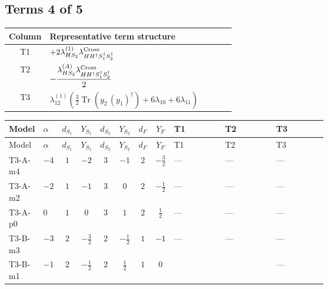 \documentclass[8pt]{article}
\begin{document}
\begin{landscape}
\subsection*{Terms 4 of 5}
\begin{center}
\begin{tabular}{@{}c >{\raggedright\arraybackslash}p{0.82\linewidth}@{}}
\toprule
Column & Representative term structure \\
\midrule
T1 & \(\displaystyle +2 {\lambda_{HS_2}^{(1)}} {\lambda_{H H^\dagger S_1^\dagger S_2^\dagger}^{\rm Cross}}\) \\
\midrule
T2 & \(\displaystyle -\frac{{\lambda_{HS_2}^{(A)}} {\lambda_{H H^\dagger S_1^\dagger S_2^\dagger}^{\rm Cross}}}{2}\) \\
\midrule
T3 & \(\displaystyle {\lambda_{12}^{(1)}} \left(\frac{3}{2} \operatorname{Tr}\!\left({y_2}\,\left({y_1}\right)^{\dagger}\right)+6 {\lambda_{10}}+6 {\lambda_{11}}\right)\) \\
\midrule
\bottomrule
\end{tabular}
\end{center}
\smallskip
\tiny
\begin{longtable}{@{}llcccccc >{\raggedright\arraybackslash}p{0.21\linewidth} >{\raggedright\arraybackslash}p{0.21\linewidth} >{\raggedright\arraybackslash}p{0.21\linewidth}@{}}
\toprule
Model & $\alpha$ & $d_{S_1}$ & $Y_{S_1}$ & $d_{S_2}$ & $Y_{S_2}$ & $d_F$ & $Y_F$ & T1 & T2 & T3 \\
\midrule
\endfirsthead
\toprule
Model & $\alpha$ & $d_{S_1}$ & $Y_{S_1}$ & $d_{S_2}$ & $Y_{S_2}$ & $d_F$ & $Y_F$ & T1 & T2 & T3 \\
\midrule
\endhead
T3-A-m4 & $-4$ & $1$ & $-2$ & $3$ & $-1$ & $2$ & $-\frac{3}{2}$ & --- & --- & --- \\
\midrule
T3-A-m2 & $-2$ & $1$ & $-1$ & $3$ & $0$ & $2$ & $-\frac{1}{2}$ & --- & --- & --- \\
\midrule
T3-A-p0 & $0$ & $1$ & $0$ & $3$ & $1$ & $2$ & $\frac{1}{2}$ & --- & --- & --- \\
\midrule
T3-B-m3 & $-3$ & $2$ & $-\frac{3}{2}$ & $2$ & $-\frac{1}{2}$ & $1$ & $-1$ & --- & --- & --- \\
\midrule
T3-B-m1 & $-1$ & $2$ & $-\frac{1}{2}$ & $2$ & $\frac{1}{2}$ & $1$ & $0$ & \scriptsize\adjustbox{max width=\linewidth}{$\begin{gathered} +2 {\lambda_{HS_2}^{(1)}} {\lambda_{H H^\dagger S_1^\dagger S_2^\dagger}^{\rm Cross}}\end{gathered}$} & \scriptsize\adjustbox{max width=\linewidth}{$\begin{gathered} -\frac{{\lambda_{HS_2}^{(A)}} {\lambda_{H H^\dagger S_1^\dagger S_2^\dagger}^{\rm Cross}}}{2}\end{gathered}$} & --- \\

\end{longtable}
\end{landscape}
\end{document}
